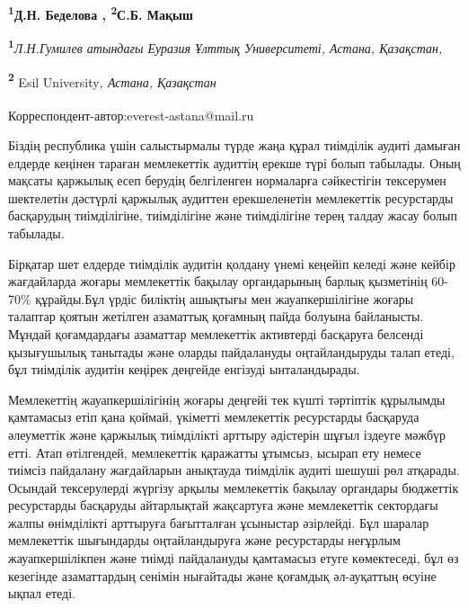 
\begin{articleheader}

{\bfseries
\textsuperscript{1}Д.Н. Беделова\textsuperscript{\envelope } \authorid,
\textsuperscript{2}С.Б. Мақыш\authorid}
\end{articleheader}

\begin{affiliation}
{\bfseries \textsuperscript{1}}\emph{Л.Н.Гумилев атындағы Еуразия Ұлттық Университеті, Астана, Қазақстан,}

{\bfseries \textsuperscript{2}} Esil University\emph{, Астана, Қазақстан}

{\bfseries \textsuperscript{\envelope }}Корреспондент-автор:everest-astana@mail.ru
\end{affiliation}

Біздің республика үшін салыстырмалы түрде жаңа құрал тиімділік аудиті
дамыған елдерде кеңінен тараған мемлекеттік аудиттің ерекше түрі болып
табылады. Оның мақсаты қаржылық есеп берудің белгіленген нормаларға
сәйкестігін тексерумен шектелетін дәстүрлі қаржылық аудиттен
ерекшеленетін мемлекеттік ресурстарды басқарудың тиімділігіне,
тиімділігіне және тиімділігіне терең талдау жасау болып табылады.

Бірқатар шет елдерде тиімділік аудитін қолдану үнемі кеңейіп келеді және
кейбір жағдайларда жоғары мемлекеттік бақылау органдарының барлық
қызметінің 60-70\% құрайды.Бұл үрдіс биліктің ашықтығы мен
жауапкершілігіне жоғары талаптар қоятын жетілген азаматтық қоғамның
пайда болуына байланысты. Мұндай қоғамдардағы азаматтар мемлекеттік
активтерді басқаруға белсенді қызығушылық танытады және оларды
пайдалануды оңтайландыруды талап етеді, бұл тиімділік аудитін кеңірек
деңгейде енгізуді ынталандырады.

Мемлекеттің жауапкершілігінің жоғары деңгейі тек күшті тәртіптік
құрылымды қамтамасыз етіп қана қоймай, үкіметті мемлекеттік ресурстарды
басқаруда әлеуметтік және қаржылық тиімділікті арттыру әдістерін шұғыл
іздеуге мәжбүр етті. Атап өтілгендей, мемлекеттік қаражатты ұтымсыз,
ысырап ету немесе тиімсіз пайдалану жағдайларын анықтауда тиімділік
аудиті шешуші рөл атқарады. Осындай тексерулерді жүргізу арқылы
мемлекеттік бақылау органдары бюджеттік ресурстарды басқаруды
айтарлықтай жақсартуға және мемлекеттік сектордағы жалпы өнімділікті
арттыруға бағытталған ұсыныстар әзірлейді. Бұл шаралар мемлекеттік
шығындарды оңтайландыруға және ресурстарды неғұрлым жауапкершілікпен
және тиімді пайдалануды қамтамасыз етуге көмектеседі, бұл өз кезегінде
азаматтардың сенімін нығайтады және қоғамдық әл-ауқаттың өсуіне ықпал
етеді.

